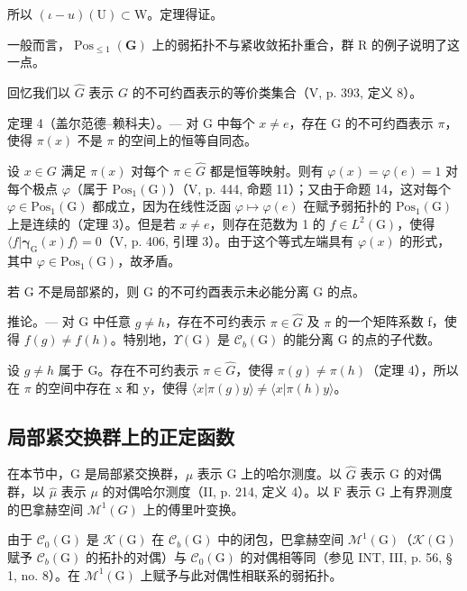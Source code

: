 所以 \((\iota - u)(\mathrm{U}) \subset \mathrm{W}\)。定理得证。

一般而言，\(\operatorname{Pos}_{\leqslant1}(\mathbf{G})\) 上的弱拓扑不与紧收敛拓扑重合，群 R 的例子说明了这一点。

回忆我们以 \(\widehat{G}\) 表示 \(G\) 的不可约酉表示的等价类集合（V, p. 393, 定义 8）。

定理 4（盖尔范德--赖科夫）。--- 对 G 中每个 \(x \neq e\)，存在 G 的不可约酉表示 \(\pi\)，使得 \(\pi(x)\) 不是 \(\pi\) 的空间上的恒等自同态。

设 \(x \in G\) 满足 \(\pi(x)\) 对每个 \(\pi \in \widehat{G}\) 都是恒等映射。则有 \(\varphi(x) = \varphi(e) = 1\) 对每个极点 \(\varphi\)（属于 \(\mathrm{Pos}_{1}(\mathrm{G})\)）（V, p. 444, 命题 11）；又由于命题 14，这对每个 \(\varphi \in \mathrm{Pos}_{1}(\mathrm{G})\) 都成立，因为在线性泛函 \(\varphi \mapsto \varphi(e)\) 在赋予弱拓扑的 \(\mathrm{Pos}_{1}(\mathrm{G})\) 上是连续的（定理 3）。但是若 \(x \neq e\)，则存在范数为 1 的 \(f \in L^{2}(\mathrm{G})\)，使得 \(\langle f | \boldsymbol{\gamma}_{\mathrm{G}}(x)f \rangle = 0\)（V, p. 406, 引理 3）。由于这个等式左端具有 \(\varphi(x)\) 的形式，其中 \(\varphi \in \mathrm{Pos}_{1}(\mathrm{G})\)，故矛盾。

若 G 不是局部紧的，则 G 的不可约酉表示未必能分离 G 的点。

推论。--- 对 G 中任意 \(g \neq h\)，存在不可约表示 \(\pi \in \widehat{G}\) 及 \(\pi\) 的一个矩阵系数 f，使得 \(f(g) \neq f(h)\)。特别地，\(\Upsilon(\mathrm{G})\) 是 \(\mathcal{C}_{b}(\mathrm{G})\) 的能分离 G 的点的子代数。

设 \(g \neq h\) 属于 G。存在不可约表示 \(\pi \in \widehat{G}\)，使得 \(\pi(g) \neq \pi(h)\)（定理 4），所以在 \(\pi\) 的空间中存在 x 和 y，使得 \(\langle x | \pi(g)y \rangle \neq \langle x | \pi(h)y \rangle\)。

\subsection{局部紧交换群上的正定函数}

在本节中，G 是局部紧交换群，\(\mu\) 表示 G 上的哈尔测度。以 \(\widehat{G}\) 表示 G 的对偶群，以 \(\widehat{\mu}\) 表示 \(\mu\) 的对偶哈尔测度（II, p. 214, 定义 4）。以 F 表示 G 上有界测度的巴拿赫空间 \(\mathcal{M}^{1}(G)\) 上的傅里叶变换。

由于 \(\mathcal{C}_0(\mathrm{G})\) 是 \(\mathcal{K}(\mathrm{G})\) 在 \(\mathcal{C}_b(\mathrm{G})\) 中的闭包，巴拿赫空间 \(\mathcal{M}^1 (\mathrm{G})\)（\(\mathcal{K}(\mathrm{G})\) 赋予 \(\mathcal{C}_b(\mathrm{G})\) 的拓扑的对偶）与 \(\mathcal{C}_0(\mathrm{G})\) 的对偶相等同（参见 INT, III, p. 56, § 1, no. 8）。在 \(\mathcal{M}^1 (\mathrm{G})\) 上赋予与此对偶性相联系的弱拓扑。

